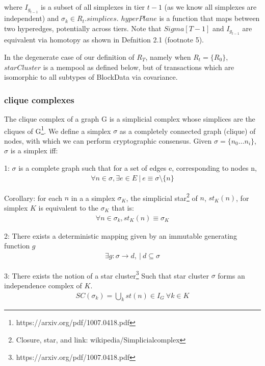 \documentclass{article}
\begin{document}
where $I_{g_{t-1}}$ is a subset of all simplexes in tier $t-1$ (as we know all simplexes are independent) and $\sigma_k \in R_t.simplices$. $hyperPlane$ is a function that maps between two hyperedges, potentially across tiers. Note that $Sigma[T-1]$ and $I_{g_{t-1}}$ are equivalent via homotopy as shown in Defnition 2.1 (footnote 5). 

In the degenerate case of our definition of $R_T$, namely when $R_t = \{R_0\}$, $starCluster$ is a mempool as defined below, but of transactions which are isomorphic to all subtypes of BlockData via covariance.


\subsubsection{clique complexes}
The clique complex of a graph G is a simplicial complex whose simplices are the cliques of G\footnote{https://arxiv.org/pdf/1007.0418.pdf}. We define a simplex $\sigma$ as a completely connected graph (clique) of nodes, with which we can perform cryptographic consensus. Given $\sigma = \{n_0 \dots n_i\}$, $\sigma$ is a simplex iff:

1: $\sigma$ is a complete graph such that for a set of edges e, corresponding to nodes n,
\begin{equation} \label{eq1}
\begin{split}
\forall n \in \sigma, \exists e \in E \ | \ e \equiv \sigma \setminus \{n\} 
\end{split}
\end{equation}

Corollary: for each $n$ in a a simplex $\sigma_K$, the simplicial star\footnote{Closure, star, and link: wikipedia/Simplicialcomplex} of $n$, $st_K(n)$, for simplex $K$ is equivalent to the $\sigma_K$ that is:
\begin{equation} \label{eq1}
\begin{split}
\forall n \in \sigma_k, st_K(n) \equiv \sigma_K
\end{split}
\end{equation}

2: There exists a deterministic mapping given by an immutable generating function $g$
\begin{equation} \label{eq1}
\begin{split}
\exists g: \sigma \rightarrow d, \ | \ d \subseteq \sigma
\end{split}
\end{equation}

3: There exists the notion of a star cluster\footnote{https://arxiv.org/pdf/1007.0418.pdf} Such that star cluster $\sigma$ forms an independence complex of $K$.
\begin{equation} \label{eq1}
\begin{split}
SC(\sigma_k) = \bigcup_k st(n) \in I_G \ \forall k \in K
\end{split}
\end{equation}
\end{document}
